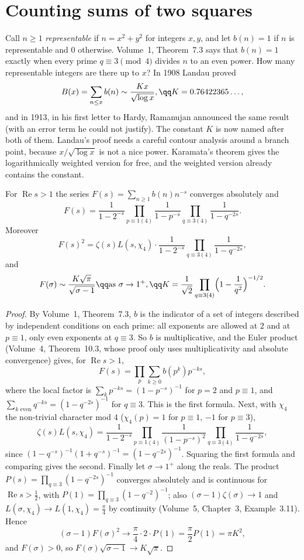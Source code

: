 \section{Counting sums of two squares}

Call $n\ge1$ \emph{representable} if $n=x^2+y^2$ for integers $x,y$, and let $b(n)=1$ if $n$ is representable and $0$ otherwise. Volume~1, Theorem~7.3 says
that $b(n)=1$ exactly when every prime $q\equiv3\pmod4$ divides $n$ to an even power. How many representable integers are there up to $x$? In 1908 Landau
proved
\[
B(x)=\sum_{n\le x}b(n)\sim\frac{Kx}{\sqrt{\log x}},\qq K=0.76422365\ldots,
\]
and in 1913, in his first letter to Hardy, Ramanujan announced the same result (with an error term he could not justify). The constant $K$ is now named
after both of them. Landau's proof needs a careful contour analysis around a branch point, because $x/\sqrt{\log x}$ is not a nice power. Karamata's theorem
gives the logarithmically weighted version for free, and the weighted version already contains the constant.

\begin{proposition}\label{prop:twosqeuler}
For $\operatorname{Re}s>1$ the series $F(s)=\sum_{n\ge1}b(n)n^{-s}$ converges absolutely and
\[
F(s)=\frac1{1-2^{-s}}\prod_{p\equiv1(4)}\frac1{1-p^{-s}}\prod_{q\equiv3(4)}\frac1{1-q^{-2s}}.
\]
Moreover
\[
F(s)^2=\zeta(s)L(s,\chi_4)\cdot\frac1{1-2^{-s}}\prod_{q\equiv3(4)}\frac1{1-q^{-2s}},
\]
and
\[
F(\sigma)\sim\frac{K\sqrt\pi}{\sqrt{\sigma-1}}\qq\text{as }\sigma\to1^+,\qq K=\frac1{\sqrt2}\prod_{q\equiv3(4)}\Bigl(1-\frac1{q^2}\Bigr)^{-1/2}.
\]
\end{proposition}
\begin{proof}
By Volume~1, Theorem~7.3, $b$ is the indicator of a set of integers described by independent conditions on each prime: all exponents are allowed at $2$ and
at $p\equiv1$, only even exponents at $q\equiv3$. So $b$ is multiplicative, and the Euler product (Volume~4, Theorem~10.3, whose proof only uses multiplicativity
and absolute convergence) gives, for $\operatorname{Re}s>1$,
\[
F(s)=\prod_p\sum_{k\ge0}b(p^k)p^{-ks},
\]
where the local factor is $\sum_kp^{-ks}=(1-p^{-s})^{-1}$ for $p=2$ and $p\equiv1$, and $\sum_{k\text{ even}}q^{-ks}=(1-q^{-2s})^{-1}$ for $q\equiv3$. This is the
first formula. Next, with $\chi_4$ the non-trivial character mod $4$ ($\chi_4(p)=1$ for $p\equiv1$, $-1$ for $p\equiv3$),
\[
\zeta(s)L(s,\chi_4)=\frac1{1-2^{-s}}\prod_{p\equiv1(4)}\frac1{(1-p^{-s})^2}\prod_{q\equiv3(4)}\frac1{1-q^{-2s}},
\]
since $(1-q^{-s})^{-1}(1+q^{-s})^{-1}=(1-q^{-2s})^{-1}$. Squaring the first formula and comparing gives the second. Finally let $\sigma\to1^+$ along the reals. The
product $P(s)=\prod_{q\equiv3}(1-q^{-2s})^{-1}$ converges absolutely and is continuous for $\operatorname{Re}s>\frac12$, with $P(1)=\prod_{q\equiv3}(1-q^{-2})^{-1}$;
also $(\sigma-1)\zeta(\sigma)\to1$ and $L(\sigma,\chi_4)\to L(1,\chi_4)=\frac\pi4$ by continuity (Volume~5, Chapter~3, Example~3.11). Hence
\[
(\sigma-1)F(\sigma)^2\longrightarrow\frac\pi4\cdot2\cdot P(1)=\frac\pi2P(1)=\pi K^2,
\]
and $F(\sigma)>0$, so $F(\sigma)\sqrt{\sigma-1}\to K\sqrt\pi$.
\end{proof}

